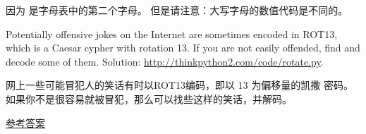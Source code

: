 \begin{exercise}
因为  是字母表中的第二个字母。 但是请注意：大写字母的数值代码是不同的。

Potentially offensive jokes on the Internet are sometimes encoded in
ROT13, which is a Caesar cypher with rotation 13.  If you are not
easily offended, find and decode some of them.  Solution:
\url{http://thinkpython2.com/code/rotate.py}.

网上一些可能冒犯人的笑话有时以ROT13编码，即以 13 为偏移量的凯撒
密码。 如果你不是很容易就被冒犯，那么可以找些这样的笑话，并解码。

\href{http://thinkpython2.com/code/rotate.py}{参考答案}

\end{exercise}